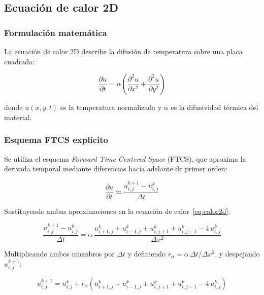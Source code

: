 \documentclass[12pt, a4paper]{article}
\begin{document}
\subsection{Ecuación de calor 2D}

\subsubsection{Formulación matemática}

La ecuación de calor 2D describe la difusión de temperatura sobre una placa cuadrada:

\begin{equation}
    \frac{\partial u}{\partial t} = \alpha
    \left(\frac{\partial^2 u}{\partial x^2} + \frac{\partial^2 u}{\partial y^2}\right)
    \label{eq:calor2d}
\end{equation}

donde $u(x,y,t)$ es la temperatura normalizada y $\alpha$ es la difusividad térmica del
material.

\subsubsection{Esquema FTCS explícito}

Se utiliza el esquema \textit{Forward Time Centered Space} (FTCS), que aproxima la
derivada temporal mediante diferencias hacia adelante de primer orden:

\begin{equation}
    \frac{\partial u}{\partial t} \approx
    \frac{u^{k+1}_{i,j} - u^k_{i,j}}{\Delta t}
\end{equation}

Sustituyendo ambas aproximaciones en la ecuación de calor~\eqref{eq:calor2d}:

\begin{equation}
    \frac{u^{k+1}_{i,j} - u^k_{i,j}}{\Delta t}
    = \alpha\,
    \frac{u^k_{i+1,j} + u^k_{i-1,j} + u^k_{i,j+1} + u^k_{i,j-1} - 4\,u^k_{i,j}}
         {\Delta x^2}
\end{equation}

Multiplicando ambos miembros por $\Delta t$ y definiendo $r_\alpha = \alpha\,\Delta t/\Delta x^2$,
y despejando $u^{k+1}_{i,j}$:

\begin{equation}
    u^{k+1}_{i,j} = u^k_{i,j} + r_\alpha\!
    \left(u^k_{i+1,j} + u^k_{i-1,j} + u^k_{i,j+1} + u^k_{i,j-1}
    - 4\,u^k_{i,j}\right)
    \label{eq:ftcs}
\end{equation}
\end{document}
